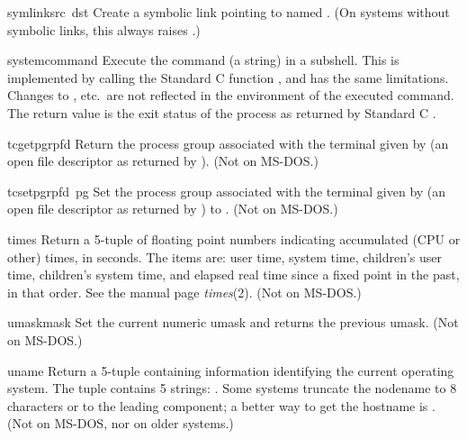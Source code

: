 \begin{funcdesc}{symlink}{src\, dst}
Create a symbolic link pointing to  named .  (On
systems without symbolic links, this always raises
.)
\end{funcdesc}

\begin{funcdesc}{system}{command}
Execute the command (a string) in a subshell.  This is implemented by
calling the Standard C function , and has the same
limitations.  Changes to ,  etc.\ are
not reflected in the environment of the executed command.  The return
value is the exit status of the process as returned by Standard C
.
\end{funcdesc}

\begin{funcdesc}{tcgetpgrp}{fd}
Return the process group associated with the terminal given by
 (an open file descriptor as returned by ).
(Not on MS-DOS.)
\end{funcdesc}

\begin{funcdesc}{tcsetpgrp}{fd\, pg}
Set the process group associated with the terminal given by
 (an open file descriptor as returned by )
to .
(Not on MS-DOS.)
\end{funcdesc}

\begin{funcdesc}{times}{}
Return a 5-tuple of floating point numbers indicating accumulated (CPU
or other)
times, in seconds.  The items are: user time, system time, children's
user time, children's system time, and elapsed real time since a fixed
point in the past, in that order.  See the \UNIX{}
manual page {\it times}(2).  (Not on MS-DOS.)
\end{funcdesc}

\begin{funcdesc}{umask}{mask}
Set the current numeric umask and returns the previous umask.
(Not on MS-DOS.)
\end{funcdesc}

\begin{funcdesc}{uname}{}
Return a 5-tuple containing information identifying the current
operating system.  The tuple contains 5 strings:
.
Some systems truncate the nodename to 8
characters or to the leading component; a better way to get the
hostname is .  (Not on MS-DOS, nor on older
\UNIX{} systems.)
\end{funcdesc}

